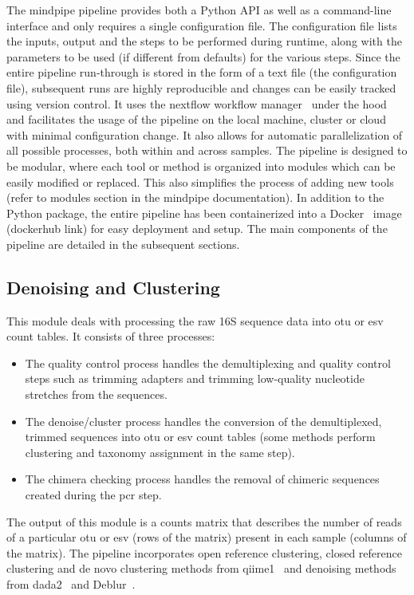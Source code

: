   The mindpipe pipeline provides both a Python API as well as a command-line interface and only requires a single configuration file.
  The configuration file lists the inputs, output and the steps to be performed during runtime, along with the parameters to be used (if different from defaults) for the various steps.
  Since the entire pipeline run-through is stored in the form of a text file (the configuration file), subsequent runs are highly reproducible and changes can be easily tracked using version control.
  It uses the nextflow workflow manager~\cite{Tommaso2015} under the hood and facilitates the usage of the pipeline on the local machine, cluster or cloud with minimal configuration change.
  It also allows for automatic parallelization of all possible processes, both within and across samples.
  The pipeline is designed to be modular, where each tool or method is organized into modules which can be easily modified or replaced.
  This also simplifies the process of adding new tools (refer to modules section in the mindpipe documentation).
  In addition to the Python package, the entire pipeline has been containerized into a Docker~\cite{Merkel1994} image (dockerhub link) for easy deployment and setup.
  The main components of the pipeline are detailed in the subsequent sections.

  \subsection*{Denoising and Clustering}
  \vspace{-5mm}
  This module deals with processing the raw 16S sequence data into \ac{otu} or \ac{esv} count tables.
  It consists of three processes:
  \begin{itemize}
    \item The quality control process handles the demultiplexing and quality control steps such as trimming adapters and trimming low-quality nucleotide stretches from the sequences.
    \item The denoise/cluster process handles the conversion of the demultiplexed, trimmed sequences into \ac{otu} or \ac{esv} count tables (some methods perform clustering and taxonomy assignment in the same step).
    \item The chimera checking process handles the removal of chimeric sequences created during the \ac{pcr} step.
  \end{itemize}
  The output of this module is a counts matrix that describes the number of reads of a particular \ac{otu} or \ac{esv} (rows of the matrix) present in each sample (columns of the matrix).
  The pipeline incorporates open reference clustering, closed reference clustering and de novo clustering methods from \ac{qiime1}~\cite{Caporaso2010} and denoising methods from \ac{dada2}~\cite{Callahan2016} and Deblur~\cite{Amir2017}.

